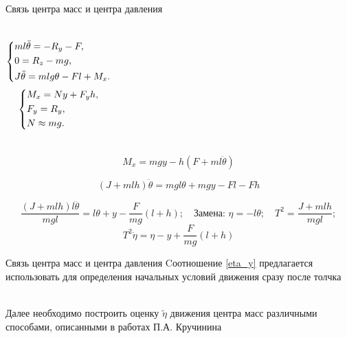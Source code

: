 \documentclass[10pt]{beamer}
\begin{document}
\begin{frame}{Связь центра масс и центра давления}
	\begin{columns}
	\begin{equation}\label{koshisystem}
    \left\{ {\begin{aligned}
                 & ml\ddot{\theta} = -R_y-F , \hfill   \\
                 & 0=R_z-mg, \hfill \\
                 & J \ddot{\theta} = mlg\theta-Fl+M_x . \hfill             \\
            \end{aligned}} \right.
\end{equation}
	\begin{equation}\label{koshisystem}
		\left\{ {\begin{aligned}
					 & M_x = Ny+F_yh , \hfill   \\
					 & F_y = R_y , \hfill \\
					 & N \approx mg . \hfill             \\
				\end{aligned}} \right.
	\end{equation}
\end{columns}

	$$M_x=mgy-h\left(F+ml\ddot{\theta}\right)$$

	$$\left(J+mlh\right)\ddot{\theta}=mgl\theta+mgy-Fl-Fh$$ 


 	$$\frac{(J+mlh)l\ddot{\theta}}{mgl}=l\theta+y-\frac{F}{mg}(l+h);\quad \text{Замена: }\eta=-l\theta; \quad T^2=\frac{J+mlh}{mgl};$$
\begin{equation}\label{eta_y}
	T^2\ddot{\eta}=\eta-y+\frac{F}{mg}(l+h)
\end{equation}

\end{frame}

\begin{frame}{Связь центра масс и центра давления}
	Cоотношение \eqref{eta_y} предлагается использовать для определения начальных условий движения сразу после толчка
	
	\hfill \\
	Далее необходимо построить оценку $\tilde\eta$ движения центра масс различными способами, описанными в работах П.А. Кручинина
\end{frame}
\end{document}
